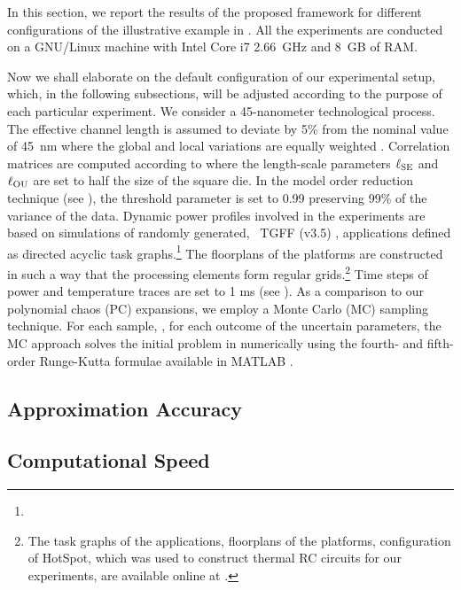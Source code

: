 
In this section, we report the results of the proposed framework for different configurations of the illustrative example in .
All the experiments are conducted on a GNU/Linux machine with Intel Core i7 2.66~GHz and 8~GB of RAM.

Now we shall elaborate on the default configuration of our experimental setup, which, in the following subsections, will be adjusted according to the purpose of each particular experiment.
We consider a 45-nanometer technological process.
The effective channel length is assumed to deviate by 5\% from the nominal value of 45~nm where the global and local variations are equally weighted \cite{juan2011, juan2012}.
Correlation matrices are computed according to  where the length-scale parameters $\ell_{\text{SE}}$ and $\ell_{\text{OU}}$ are set to half the size of the square die.
In the model order reduction technique (see ), the threshold parameter is set to 0.99 preserving 99\% of the variance of the data.
Dynamic power profiles involved in the experiments are based on simulations of randomly generated, \via\ TGFF (v3.5) \cite{dick1998}, applications defined as directed acyclic task graphs.\footnote{}
The floorplans of the platforms are constructed in such a way that the processing elements form regular grids.\footnote{The task graphs of the applications, floorplans of the platforms, configuration of HotSpot, which was used to construct thermal RC circuits for our experiments, are available online at \cite{sources}.}
Time steps of power and temperature traces are set to 1 ms (see ).
As a comparison to our polynomial chaos (PC) expansions, we employ a Monte Carlo (MC) sampling technique.
For each sample, \ie, for each outcome of the uncertain parameters, the MC approach solves the initial problem in  numerically using the fourth- and fifth-order Runge-Kutta formulae \cite{press2007} available in MATLAB \cite{matlab}.

\subsection{Approximation Accuracy} 


\subsection{Computational Speed} 

